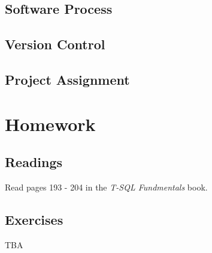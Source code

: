 \documentclass{article}
\begin{document}
        \subsection{Software Process}

        
        \subsection{Version Control}


        \subsection{Project Assignment}

    \section{Homework}


        \subsection{Readings}

        Read pages 193 - 204 in the \textit{T-SQL Fundmentals} book.
        
        \subsection{Exercises}

        TBA
\end{document}
